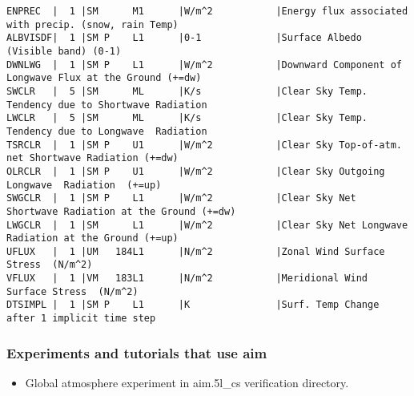 {\begin{verbatim}
ENPREC  |  1 |SM      M1      |W/m^2           |Energy flux associated with precip. (snow, rain Temp)
ALBVISDF|  1 |SM P    L1      |0-1             |Surface Albedo (Visible band) (0-1)
DWNLWG  |  1 |SM P    L1      |W/m^2           |Downward Component of Longwave Flux at the Ground (+=dw)
SWCLR   |  5 |SM      ML      |K/s             |Clear Sky Temp. Tendency due to Shortwave Radiation
LWCLR   |  5 |SM      ML      |K/s             |Clear Sky Temp. Tendency due to Longwave  Radiation
TSRCLR  |  1 |SM P    U1      |W/m^2           |Clear Sky Top-of-atm. net Shortwave Radiation (+=dw)
OLRCLR  |  1 |SM P    U1      |W/m^2           |Clear Sky Outgoing Longwave  Radiation  (+=up)
SWGCLR  |  1 |SM P    L1      |W/m^2           |Clear Sky Net Shortwave Radiation at the Ground (+=dw)
LWGCLR  |  1 |SM      L1      |W/m^2           |Clear Sky Net Longwave  Radiation at the Ground (+=up)
UFLUX   |  1 |UM   184L1      |N/m^2           |Zonal Wind Surface Stress  (N/m^2)
VFLUX   |  1 |VM   183L1      |N/m^2           |Meridional Wind Surface Stress  (N/m^2)
DTSIMPL |  1 |SM P    L1      |K               |Surf. Temp Change after 1 implicit time step
\end{verbatim}
}

\subsubsection{Experiments and tutorials that use aim}
\label{sec:pkg:aim:experiments}

\begin{itemize}
\item{Global atmosphere experiment in aim.5l\_cs verification directory. }
\end{itemize}

